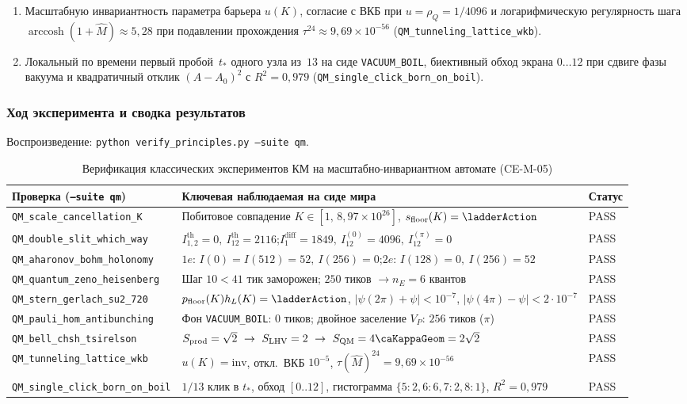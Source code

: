 \begin{enumerate}[label=\textbf{(\alph*)},leftmargin=*,itemsep=0.25em]
\item Масштабную инвариантность параметра барьера $u(K)$, согласие с ВКБ при $u=\rho_Q=1/4096$ и логарифмическую регулярность шага $\operatorname{arccosh}(1+\hat M)\approx 5{,}28$ при подавлении прохождения $\tau^{24}\approx 9{,}69\times 10^{-56}$ (\texttt{QM\_tunneling\_lattice\_wkb}).
\item Локальный по времени первый пробой~$t_*$ одного узла из~$13$ на сиде \texttt{VACUUM\_BOIL}, биективный обход экрана $0\ldots 12$ при сдвиге фазы вакуума и квадратичный отклик $(A-A_0)^2$ с $R^2=0{,}979$ (\texttt{QM\_single\_click\_born\_on\_boil}).
\end{enumerate}

\subsubsection*{Ход эксперимента и сводка результатов}
Воспроизведение: \texttt{python verify\_principles.py --suite qm}.

\begin{table}[htbp]
\centering
\small
\caption{Верификация классических экспериментов КМ на масштабно-инвариантном автомате (CE-M-05)}
\label{tab:exp-ce-m-05}
\begin{tabular}{@{}lll@{}}
\toprule
Проверка (\texttt{--suite qm}) & Ключевая наблюдаемая на сиде мира & Статус \\
\midrule
\texttt{QM\_scale\_cancellation\_K} & Побитовое совпадение $K\in[1,\,8{,}97\times 10^{26}]$, $s_{\mathrm{floor}}(K)=\ladderAction$ & PASS \\
\texttt{QM\_double\_slit\_which\_way} & $I_{1,2}^{\mathrm{th}}=0,\ I_{12}^{\mathrm{th}}=2116$;\quad $I_1^{\mathrm{diff}}=1849,\ I_{12}^{(0)}=4096,\ I_{12}^{(\pi)}=0$ & PASS \\
\texttt{QM\_aharonov\_bohm\_holonomy} & $1e$: $I(0)=I(512)=52,\ I(256)=0$;\quad $2e$: $I(128)=0,\ I(256)=52$ & PASS \\
\texttt{QM\_quantum\_zeno\_heisenberg} & Шаг $10<41$ тик заморожен; $250$ тиков $\to n_E=6$ квантов & PASS \\
\texttt{QM\_stern\_gerlach\_su2\_720} & $p_{\mathrm{floor}}(K)h_L(K)=\ladderAction$, $|\psi(2\pi)+\psi|<10^{-7}$, $|\psi(4\pi)-\psi|<2\cdot 10^{-7}$ & PASS \\
\texttt{QM\_pauli\_hom\_antibunching} & Фон \texttt{VACUUM\_BOIL}: $0$ тиков; двойное заселение $V_P$: $256$ тиков ($\pi$) & PASS \\
\texttt{QM\_bell\_chsh\_tsirelson} & $S_{\mathrm{prod}}=\sqrt{2}\ \to\ S_{\mathrm{LHV}}=2\ \to\ S_{\mathrm{QM}}=4\caKappaGeom=2\sqrt{2}$ & PASS \\
\texttt{QM\_tunneling\_lattice\_wkb} & $u(K)=\mathrm{inv}$, откл.\ ВКБ $10^{-5}$, $\tau(\hat M)^{24}=9{,}69\times 10^{-56}$ & PASS \\
\texttt{QM\_single\_click\_born\_on\_boil} & $1/13$ клик в $t_*$, обход $[0..12]$, гистограмма $\{5{:}2,6{:}6,7{:}2,8{:}1\}$, $R^2=0{,}979$ & PASS \\
\bottomrule
\end{tabular}
\end{table}

